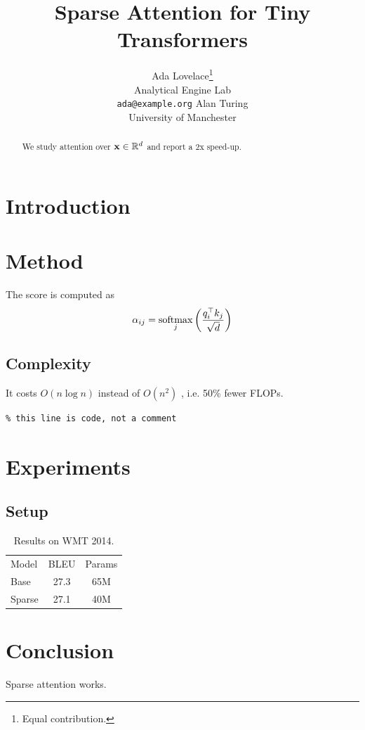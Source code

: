 \documentclass{article}
\title{Sparse Attention for Tiny Transformers}
\author{Ada Lovelace\thanks{Equal contribution.} \\ Analytical Engine Lab \\ \texttt{ada@example.org}
  \And Alan Turing \\ University of Manchester}
\newcommand{\R}{\mathbb{R}}
\begin{document}
\maketitle
\begin{abstract}
We study attention over $\vx \in \R^d$ and report a 2x speed-up. %
\end{abstract}

\section{Introduction}


\section{Method}
The score is \mymac{} computed as
\begin{equation}
\alpha_{ij} = \operatorname*{softmax}_j\left(\frac{q_i^\top k_j}{\sqrt{d}}\right)
\end{equation}
\subsection{Complexity}
It costs $O(n \log n)$ instead of $O(n^2)$ \cite{vaswani2017,child2019}, i.e. 50\% fewer FLOPs.
\begin{verbatim}
% this line is code, not a comment

\end{verbatim}

\section{Experiments}
\subsection{Setup}

\begin{table}[h]
\centering
\begin{tabular}{lcc}
Model & BLEU & Params \\
Base & 27.3 & 65M \\
Sparse & 27.1 & 40M \\
\end{tabular}
\caption{Results on WMT 2014.}
\end{table}

\section{Conclusion}
Sparse attention works.



\end{document}
